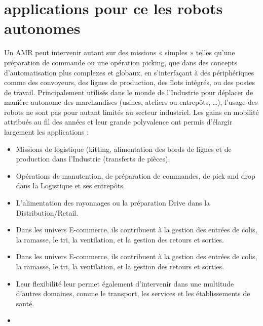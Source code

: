 \section{applications pour ce les robots autonomes}
Un AMR peut intervenir autant sur des missions « simples » telles qu’une préparation de commande ou une opération picking, que dans des concepts d’automatisation plus complexes et globaux, en s’interfaçant à des périphériques comme des convoyeurs, des lignes de production, des îlots intégrés, ou des postes de travail. Principalement utilisés dans le monde de l’Industrie pour déplacer de manière autonome des marchandises (usines, ateliers ou entrepôts, …), l’usage des robots ne sont pas pour autant limités au secteur industriel. Les gains en mobilité attribués au fil des années et leur grande polyvalence ont permis d’élargir largement les applications :
\begin{itemize}
    \item Missions de logistique (kitting, alimentation des bords de lignes et de production dans l’Industrie (transferts de pièces).
    \item Opérations de manutention, de préparation de commandes, de pick and drop dans la Logistique et ses entrepôts.
    \item L’alimentation des rayonnages ou la préparation Drive dans la Distribution/Retail.
    \item Dans les univers E-commerce, ils contribuent à la gestion des entrées de colis, la ramasse, le tri, la ventilation, et la gestion des retours et sorties.
    \item Dans les univers E-commerce, ils contribuent à la gestion des entrées de colis, la ramasse, le tri, la ventilation, et la gestion des retours et sorties.
    \item Leur flexibilité leur permet également d’intervenir dans une multitude d’autres domaines, comme le transport, les services et les établissements de santé.
    \item

\end{itemize}



